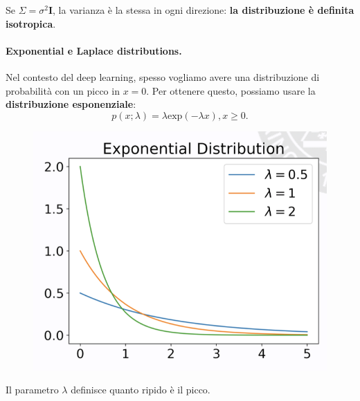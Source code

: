 Se \textbf{$\Sigma=\sigma^2\mathbf{I}$}, la varianza è la stessa in ogni direzione: \textbf{la distribuzione è definita isotropica}.
\newpage
\paragraph{Exponential e Laplace distributions.} Nel contesto del deep learning, spesso vogliamo avere una distribuzione di probabilità con un picco in $x=0$. Per ottenere questo, possiamo usare la \textbf{distribuzione esponenziale}:
\begin{equation}
    p(x;\lambda)=\lambda\text{exp}(-\lambda x), x\geq0.
\end{equation}
\begin{figure}[!h]
    \includegraphics[scale=.7]{images/prerequisites/exp.png}
    \centering
\end{figure}
Il parametro $\lambda$ definisce quanto ripido è il picco.




